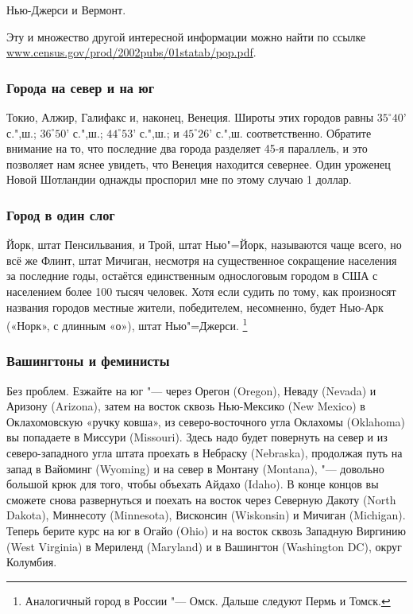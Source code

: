 \documentclass[twoside]{book}
\begin{document}
Нью-Джерси и Вермонт.

Эту и множество другой интересной информации можно найти по ссылке
\href{http//www.census.gov/prod/2002pubs/01statab/pop.pdf}{\url{www.census.gov/prod/2002pubs/01statab/pop.pdf}}.
 \heart                          

\subsubsection*{Города на север и на юг}%

Токио, Алжир, Галифакс и, наконец, Венеция.
Широты этих городов равны
$35^\circ 40’$ с.",ш.; $36^\circ 50’$ с.",ш.; $44^\circ 53’$ с.",ш.; и $45^\circ 26’$ с.",ш. соответственно.
Обратите внимание на то, что последние два города разделяет 45-я параллель, и это позволяет нам яснее увидеть, что Венеция находится севернее.
Один уроженец Новой Шотландии однажды проспорил мне по этому случаю 1 доллар.
\heart

\subsubsection*{Город в один слог}%

Йорк, штат Пенсильвания, и Трой, штат Нью"=Йорк, называются чаще всего, но всё же Флинт, штат Мичиган, несмотря на существенное сокращение населения за последние годы, остаётся единственным однослоговым городом в США с населением более 100 тысяч человек.
Хотя если судить по тому, как произносят названия городов местные жители, победителем, несомненно, будет Нью-Арк («Норк», с длинным «о»), штат Нью"=Джерси.%
\footnote{Аналогичный город в России "--- Омск. Дальше следуют Пермь и Томск.}
\heart

\subsubsection*{Вашингтоны и феминисты} %

{\sloppy 

Без проблем.
Езжайте на юг "--- через Орегон (Oregon), 
Неваду (Nevada) 
и Аризону (Arizona), 
затем на восток сквозь Нью-Мексико (New Mexico) 
в Оклахомовскую «ручку ковша», из северо-восточного угла Оклахомы (Oklahoma) 
вы попадаете в Миссури (Mis\-sou\-ri).
Здесь надо будет повернуть на север и из северо-западного угла штата проехать в Небраску (Nebraska), продолжая путь на запад в Вайоминг (Wyoming) и на север в Монтану (Montana), "--- довольно большой крюк для того, чтобы объехать Айдахо (Idaho).
В конце концов вы сможете снова развернуться и поехать на восток через Северную Дакоту (North Dakota), 
Миннесоту (Minnesota), 
Висконсин (Wiskonsin) 
и Мичиган (Michigan).
Теперь берите курс на юг в Огайо (Ohio) и на восток сквозь Западную Виргинию (West Virginia) в Мериленд (Maryland)
 и в Вашингтон (Washington DC), округ Колумбия.\heart
 
}
\end{document}
